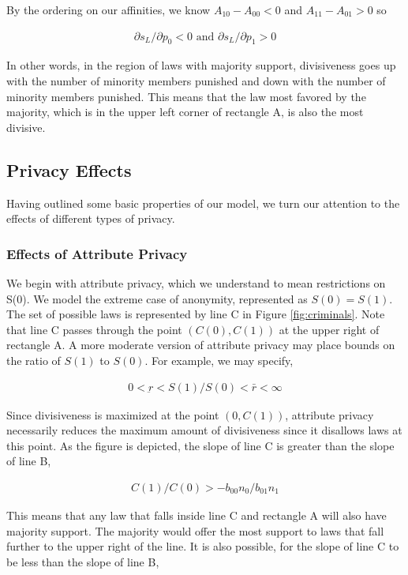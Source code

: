 By the ordering on our affinities, we know $A_{10} - A_{00}  < 0$ and $A_{11} - A_{01} > 0$ so

\begin{align}
\partial s_L / \partial p_0 <0  \text{ and } \partial s_L / \partial p_1 >0
\end{align}

In other words, in the region of laws with majority support, divisiveness goes up with the number of minority members punished and down with the number of minority members punished.  This means that the law most favored by the majority, which is in the upper left corner of rectangle A, is also the most divisive.

\subsection{Privacy Effects}
Having outlined some basic properties of our model, we turn our attention to the effects of different types of privacy.  

\subsubsection{Effects of Attribute Privacy}
We begin with attribute privacy, which we understand to mean restrictions on S(0).  We model the extreme case of anonymity, represented as $S(0) = S(1)$.  The set of possible laws is represented by line C in Figure \ref{fig:criminals}.  Note that line C passes through the point $ \left(C(0), C(1) \right)$ at the upper right of rectangle A.  A more moderate version of attribute privacy may place bounds on the ratio of $S(1)$ to $S(0)$.  For example, we may specify,

\begin{align}
0 < \underbar r < S(1) /S(0) < \bar r < \infty
\end{align}

Since divisiveness is maximized at the point $ \left(0, C(1) \right)$, attribute privacy necessarily reduces the maximum amount of divisiveness since it disallows laws at this point.  As the figure is depicted, the slope of line C is greater than the slope of line B,

\begin{align}
C(1)/C(0) > - b_{00}n_0 / b_{01}n_1 
\end{align}

This means that any law that falls inside line C and rectangle A will also have majority support.  The majority would offer the most support to laws that fall further to the upper right of the line.  It is also possible, for the slope of line C to be less than the slope of line B,

